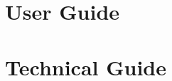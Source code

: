 \documentclass[a4paper,11pt]{book}
\begin{document}
\mainmatter
\pagestyle{fancy}

\part{User Guide}

% 
% 
% 


\part{Technical Guide}
% 

% 
% 


\backmatter


\end{document}
